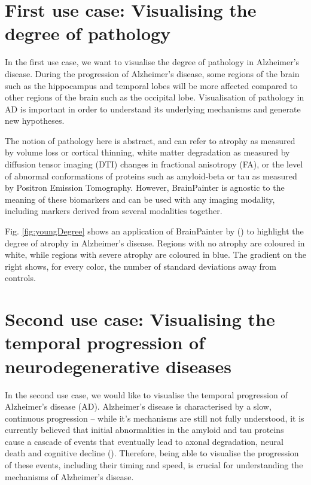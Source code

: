 \documentclass[final,times,twocolumn,authoryear]{elsarticle}
\begin{document}
\section{First use case: Visualising the degree of pathology}
\label{degree}

In the first use case, we want to visualise the degree of pathology in Alzheimer's disease. During the progression of Alzheimer's disease, some regions of the brain such as the hippocampus and temporal lobes will be more affected compared to other regions of the brain such as the occipital lobe. Visualisation of pathology in AD is important in order to understand its underlying mechanisms and generate new hypotheses. 

The notion of pathology here is abstract, and can refer to atrophy as measured by volume loss or cortical thinning, white matter degradation as measured by diffusion tensor imaging (DTI) changes in fractional anisotropy (FA), or the level of abnormal conformations of proteins such as amyloid-beta or tau as measured by Positron Emission Tomography. However, BrainPainter is agnostic to the meaning of these biomarkers and can be used with any imaging modality, including markers derived from several modalities together. 

Fig. \ref{fig:youngDegree} shows an application of BrainPainter by (\cite{young2018uncovering}) to highlight the degree of atrophy in Alzheimer's disease. Regions with no atrophy are coloured in white, while regions with severe atrophy are coloured in blue. The gradient on the right shows, for every color, the number of standard deviations away from controls.


\section{Second use case: Visualising the temporal progression of neurodegenerative diseases}
\label{progression2}

In the second use case, we would like to visualise the temporal progression of Alzheimer's disease (AD). Alzheimer's disease is characterised by a slow, continuous progression -- while it's mechanisms are still not fully understood, it is currently believed that initial abnormalities in the amyloid and tau proteins cause a cascade of events that eventually lead to axonal degradation, neural death and cognitive decline (\cite{mudher2002alzheimer}). Therefore, being able to visualise the progression of these events, including their timing and speed, is crucial for understanding the mechanisms of Alzheimer's disease. 
\end{document}
